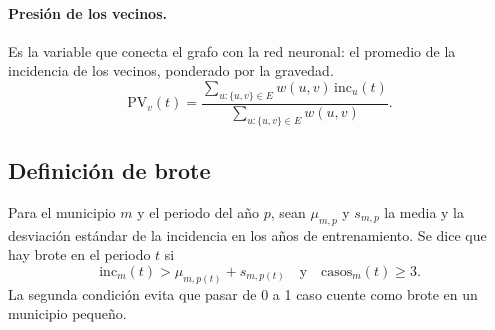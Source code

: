 \documentclass[11pt,letterpaper]{article}
\newcommand{\inc}{\mathrm{inc}}
\begin{document}
\paragraph{Presión de los vecinos.} Es la variable que conecta el grafo con la red neuronal: el promedio de la incidencia de los vecinos, ponderado por la gravedad.
\begin{equation}
  \mathrm{PV}_v(t) = \frac{\sum_{u:\{u,v\}\in E} w(u,v)\,\inc_u(t)}{\sum_{u:\{u,v\}\in E} w(u,v)}.
\end{equation}

\subsection{Definición de brote}
Para el municipio $m$ y el periodo del año $p$, sean $\mu_{m,p}$ y $s_{m,p}$ la media y la desviación estándar de la incidencia en los años de entrenamiento. Se dice que hay brote en el periodo $t$ si
\begin{equation}
  \inc_m(t) > \mu_{m,p(t)} + s_{m,p(t)} \quad\text{y}\quad \text{casos}_m(t) \ge 3 .
\end{equation}
La segunda condición evita que pasar de 0 a 1 caso cuente como brote en un municipio pequeño.
\end{document}
